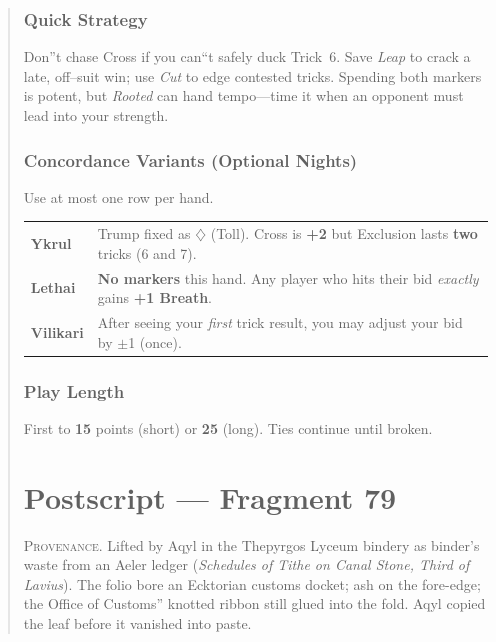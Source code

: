 \documentclass[11pt]{article}
\begin{document}
\begin{quote}
\subsubsection*{Quick Strategy}
Don''t chase Cross if you can``t safely duck Trick~6. Save \emph{Leap} to crack a late,
off--suit win; use \emph{Cut} to edge contested tricks. Spending both markers is potent,
but \emph{Rooted} can hand tempo---time it when an opponent must lead into your strength.

\subsubsection*{Concordance Variants (Optional Nights)}
Use at most one row per hand.
\medskip

\noindent\begin{tabularx}{\linewidth}{@{}>{\bfseries}l X@{}}
\toprule
Ykrul & Trump fixed as $\diamondsuit$ (Toll). Cross is \textbf{+2} but Exclusion lasts \textbf{two} tricks (6 and 7).\\
Lethai & \textbf{No markers} this hand. Any player who hits their bid \emph{exactly} gains \textbf{+1 Breath}.\\
Vilikari & After seeing your \emph{first} trick result, you may adjust your bid by $\pm$1 (once).\\
\bottomrule
\end{tabularx}

\subsubsection*{Play Length}
First to \textbf{15} points (short) or \textbf{25} (long). Ties continue until broken.


\clearpage


\section*{Postscript --- Fragment 79}
\label{sec:postscript}

\medskip
\noindent\small\textsc{Provenance.} Lifted by Aqyl in the Thepyrgos Lyceum bindery as binder's waste from an Aeler ledger (\emph{Schedules of Tithe on Canal Stone, Third of Lavius}). The folio bore an Ecktorian customs docket; ash on the fore-edge; the Office of Customs'' knotted ribbon still glued into the fold. Aqyl copied the leaf before it vanished into paste.\normalsize


\end{quote}
\end{document}
